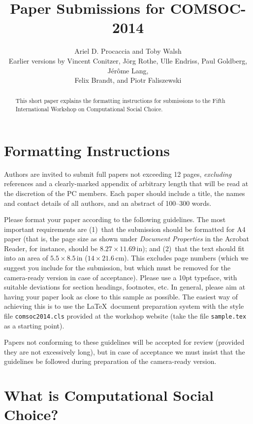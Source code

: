 \documentclass{comsoc2014}
\title{Paper Submissions for COMSOC-2014}
\author{Ariel D. Procaccia and Toby Walsh\\$ $ \\
\footnotesize{Earlier versions by Vincent Conitzer, J\"org Rothe, Ulle Endriss, Paul Goldberg, J\'er\^ome Lang,\\ Felix Brandt, and Piotr Faliszewski}}
\begin{document}

\begin{abstract}
  This short paper explains the formatting instructions for
  submissions to the Fifth International Workshop on Computational
  Social Choice.
\end{abstract}


\section{Formatting Instructions}

Authors are invited to submit full papers not exceeding 12 pages, 
\emph{excluding} references and a clearly-marked appendix of arbitrary length that will be read at the discretion of the PC members. Each paper should include 
a title, the names and contact details of all authors, and an abstract 
of 100--300 words.

Please format your paper according to the following guidelines.
The most important requirements are (1)~that the submission should be 
formatted for A4 paper (that is, the page size as shown under 
\emph{Document Properties} in the Acrobat Reader, for instance, should 
be $8.27\times 11.69\,\mbox{in}$); and (2)~that the text should fit into 
an area of $5.5\times 8.5\,\mbox{in}$ ($14\times 21.6\,\mbox{cm}$). 
This excludes page numbers (which we suggest you include for the 
submission, but which must be removed for the camera-ready version in 
case of acceptance). Please use a 10pt typeface, with suitable deviations
for section headings, footnotes, etc. In general, please aim at having 
your paper look as close to this sample as possible. The easiest way of 
achieving this is to use the \LaTeX\ document preparation system with the 
style file \texttt{comsoc2014.cls} provided at the workshop website 
(take the file \texttt{sample.tex} as a starting point).

Papers not conforming to these guidelines will be accepted for review
(provided they are not excessively long), but in case of acceptance we
must insist that the guidelines be followed during preparation of the 
camera-ready version.  


\section{What is Computational Social Choice?}
\end{document}
